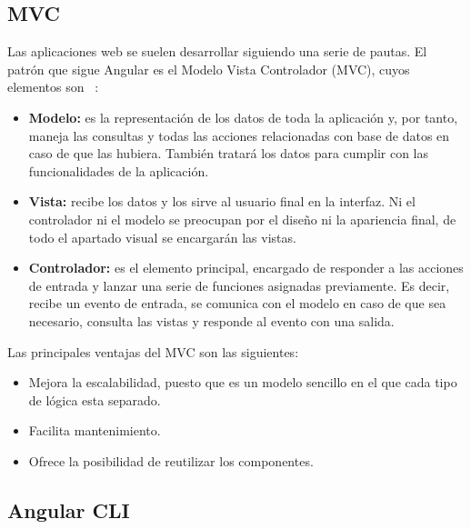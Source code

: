 \documentclass[a4paper, 12pt]{book}
\begin{document}
\subsection{MVC} 
\label{sec:mvc}

Las aplicaciones web se suelen desarrollar siguiendo una serie de pautas. El patrón que sigue Angular es el Modelo Vista Controlador (MVC), cuyos elementos son~\cite{mvc} :

\begin{itemize}
 
	\item \textbf{Modelo:} es la representación de los datos de toda la aplicación y, por tanto, maneja las consultas y todas las acciones relacionadas con base de datos en caso de que las hubiera. También tratará los datos para cumplir con las funcionalidades de la aplicación.
 
	\item \textbf{Vista:} recibe los datos y los sirve al usuario final en la interfaz. Ni el controlador ni el modelo se preocupan por el diseño ni la apariencia final, de todo el apartado visual se encargarán las vistas.

	\item \textbf{Controlador:} es el elemento principal, encargado de responder a las acciones de entrada y lanzar una serie de funciones asignadas previamente. Es decir, recibe un evento de entrada, se comunica con el modelo en caso de que sea necesario, consulta las vistas y responde al evento con una salida.

\end{itemize}

Las principales ventajas del MVC son las siguientes:

\begin{itemize}
 
	\item Mejora la escalabilidad, puesto que es un modelo sencillo en el que cada tipo de lógica esta separado.
 
	\item Facilita mantenimiento.

	\item Ofrece la posibilidad de reutilizar los componentes.

\end{itemize}

\subsection{Angular CLI} 
\label{sec:angularcli}
\end{document}
